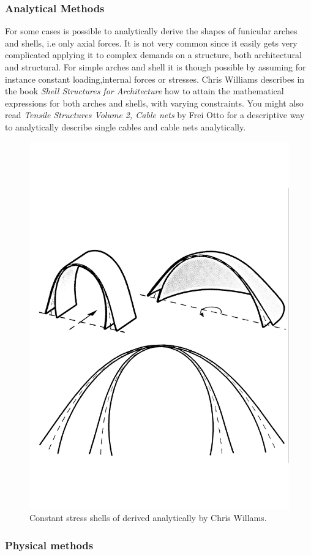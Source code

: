 \subsubsection{Analytical Methods}

For some cases is possible to analytically derive the shapes of funicular arches and shells, i.e only axial forces. It is not very common since it easily gets very complicated applying it to complex demands on a structure, both architectural and structural. For simple arches and shell it is though possible by assuming for instance constant loading,internal forces or stresses.  Chris Williams describes in the book \textit{Shell Structures for Architecture} how to attain the mathematical expressions for both arches and shells, with varying constraints.
You might also read \textit{ Tensile Structures Volume 2,  Cable nets} by Frei Otto for a descriptive way to analytically describe single cables and cable nets analytically. 

\begin{figure}[H]
\centering
\includegraphics[width=0.6\linewidth ]{figure/Introduction/constantShell.pdf}
\caption{Constant stress shells of derived analytically by Chris Willams. }
\end{figure}


\subsubsection{Physical methods}

